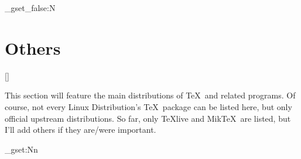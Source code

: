 \documentclass{scrartcl}
\begin{document}
\typesetwholecontent
\ExplSyntaxNamesOn
\bool_gset_false:N\short
\ExplSyntaxNamesOff
\typesetwholecontent

\clearpage
\part{Others}
[\distro]
\parbox{\textwidth}{\normalsize
This section will feature the main distributions of \TeX\ and related programs. Of course, not every Linux Distribution's \TeX\ package can be listed here, but only official upstream distributions. So far, only \TeX live and Mik\TeX\ are listed, but I'll add others if they are/were important.
}

\ExplSyntaxOn
\fp_gset:Nn
\ExplSyntaxOff

\end{document}
